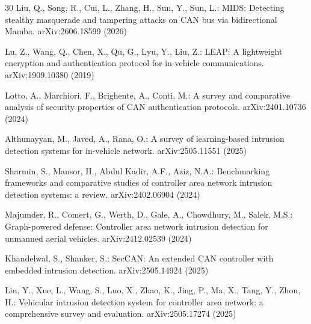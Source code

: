 \documentclass[runningheads]{llncs}%
\begin{document}
\begin{thebibliography}{30}
Liu, Q., Song, R., Cui, L., Zhang, H., Sun, Y., Sun, L.: MIDS: Detecting stealthy masquerade and tampering attacks on CAN bus via bidirectional Mamba. arXiv:2606.18599 (2026)

Lu, Z., Wang, Q., Chen, X., Qu, G., Lyu, Y., Liu, Z.: LEAP: A lightweight encryption and authentication protocol for in-vehicle communications. arXiv:1909.10380 (2019)

Lotto, A., Marchiori, F., Brighente, A., Conti, M.: A survey and comparative analysis of security properties of CAN authentication protocols. arXiv:2401.10736 (2024)

Althunayyan, M., Javed, A., Rana, O.: A survey of learning-based intrusion detection systems for in-vehicle network. arXiv:2505.11551 (2025)

Sharmin, S., Mansor, H., Abdul Kadir, A.F., Aziz, N.A.: Benchmarking frameworks and comparative studies of controller area network intrusion detection systems: a review. arXiv:2402.06904 (2024)

Majumder, R., Comert, G., Werth, D., Gale, A., Chowdhury, M., Salek, M.S.: Graph-powered defense: Controller area network intrusion detection for unmanned aerial vehicles. arXiv:2412.02539 (2024)

Khandelwal, S., Shanker, S.: SecCAN: An extended CAN controller with embedded intrusion detection. arXiv:2505.14924 (2025)

Liu, Y., Xue, L., Wang, S., Luo, X., Zhao, K., Jing, P., Ma, X., Tang, Y., Zhou, H.: Vehicular intrusion detection system for controller area network: a comprehensive survey and evaluation. arXiv:2505.17274 (2025)

\end{thebibliography}
\end{document}
